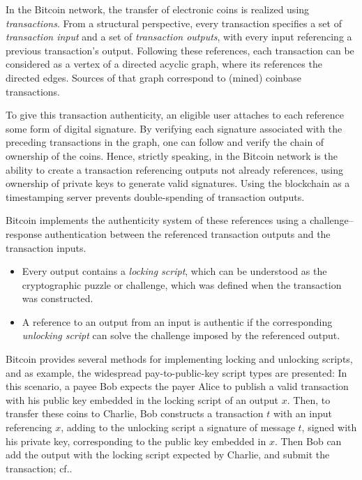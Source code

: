 \documentclass[a4paper,11pt,titlepage]{scrbook}
\begin{document}
In the Bitcoin network, the transfer of electronic coins is realized using \emph{transactions}.
From a structural perspective, every transaction specifies a set of \emph{transaction input} and a set of \emph{transaction outputs}, with every input referencing a previous transaction's output.
Following these references, each transaction can be considered as a vertex of a directed acyclic graph, where  its references the directed edges. Sources of that graph correspond to (mined) coinbase transactions.

To give this transaction authenticity, an eligible user attaches to each reference some form of digital signature.
By verifying each signature associated with the preceding transactions in the graph, one can follow and verify the chain of ownership of the coins.
Hence, strictly speaking,  in the Bitcoin network is the ability to create a transaction referencing outputs not already references, using ownership of private keys to generate valid signatures.
Using the blockchain as a timestamping server prevents double-spending of transaction outputs.

Bitcoin implements the authenticity system of these references using a challenge–response authentication between the referenced transaction outputs and the transaction inputs.

\begin{itemize}
    \item Every output contains a \emph{locking script}, which can be understood as the cryptographic puzzle or challenge, which was defined when the transaction was constructed.
    \item A reference to an output from an input is authentic if the corresponding \emph{unlocking script} can solve the challenge imposed by the referenced output.
\end{itemize}

Bitcoin provides several methods for implementing locking and unlocking scripts, and as example, the widespread pay-to-public-key script types are presented: In this scenario, a payee Bob expects the payer Alice to publish a valid transaction with his public key embedded in the locking script of an output $x$.
Then, to transfer these coins to Charlie, Bob constructs a transaction $t$ with an input referencing $x$, adding to the unlocking script a signature of message $t$, signed with his private key, corresponding to the public key embedded in $x$.
Then Bob can add the output with the locking script expected by Charlie, and submit the transaction; cf.\@ \cite[Chap.~6--7]{antonopoulos_mastering_2017}.
\end{document}
